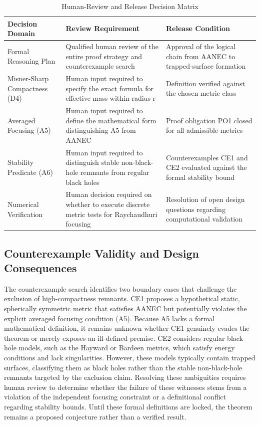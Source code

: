 \documentclass[conference]{IEEEtran}
\begin{document}
\begin{table}[htbp]
\centering
\footnotesize
\setlength{\tabcolsep}{3pt}
\renewcommand{\arraystretch}{1.12}
\caption{Human-Review and Release Decision Matrix}
\label{tab:risk-limitations-and-review-rl-002}
\begin{tabular}{|p{}|p{}|p{}|}
\hline
Decision Domain & Review Requirement & Release Condition \\\hline
Formal Reasoning Plan & Qualified human review of the entire proof strategy and counterexample search & Approval of the logical chain from AANEC to trapped-surface formation \\\hline
Misner-Sharp Compactness (D4) & Human input required to specify the exact formula for effective mass within radius r & Definition verified against the chosen metric class \\\hline
Averaged Focusing (A5) & Human input required to define the mathematical form distinguishing A5 from AANEC & Proof obligation PO1 closed for all admissible metrics \\\hline
Stability Predicate (A6) & Human input required to distinguish stable non-black-hole remnants from regular black holes & Counterexamples CE1 and CE2 evaluated against the formal stability bound \\\hline
Numerical Verification & Human decision required on whether to execute discrete metric tests for Raychaudhuri focusing & Resolution of open design questions regarding computational validation \\\hline
\end{tabular}
\end{table}

\subsection{Counterexample Validity and Design Consequences}
The counterexample search identifies two boundary cases that challenge the exclusion of high-compactness remnants. CE1 proposes a hypothetical static, spherically symmetric metric that satisfies AANEC but potentially violates the explicit averaged focusing condition (A5). Because A5 lacks a formal mathematical definition, it remains unknown whether CE1 genuinely evades the theorem or merely exposes an ill-defined premise. CE2 considers regular black hole models, such as the Hayward or Bardeen metrics, which satisfy energy conditions and lack singularities. However, these models typically contain trapped surfaces, classifying them as black holes rather than the stable non-black-hole remnants targeted by the exclusion claim. Resolving these ambiguities requires human review to determine whether the failure of these witnesses stems from a violation of the independent focusing constraint or a definitional conflict regarding stability bounds. Until these formal definitions are locked, the theorem remains a proposed conjecture rather than a verified result.
\end{document}
